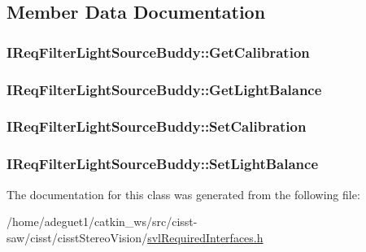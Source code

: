\subsection{Member Data Documentation}
\hypertarget{class_i_req_filter_light_source_buddy_ad55805514f5fd65daffc97e1e0a17960}{
\subsubsection[{Get\-Calibration}]{ I\-Req\-Filter\-Light\-Source\-Buddy\-::\-Get\-Calibration}}\label{class_i_req_filter_light_source_buddy_ad55805514f5fd65daffc97e1e0a17960}
\hypertarget{class_i_req_filter_light_source_buddy_a02d7dd402542d60b0e2a8eab49ae0996}{
\subsubsection[{Get\-Light\-Balance}]{ I\-Req\-Filter\-Light\-Source\-Buddy\-::\-Get\-Light\-Balance}}\label{class_i_req_filter_light_source_buddy_a02d7dd402542d60b0e2a8eab49ae0996}
\hypertarget{class_i_req_filter_light_source_buddy_a935725df98772111c6bb59934969bbad}{
\subsubsection[{Set\-Calibration}]{ I\-Req\-Filter\-Light\-Source\-Buddy\-::\-Set\-Calibration}}\label{class_i_req_filter_light_source_buddy_a935725df98772111c6bb59934969bbad}
\hypertarget{class_i_req_filter_light_source_buddy_a27a4cb9b757819473851dc8ba62e1241}{
\subsubsection[{Set\-Light\-Balance}]{ I\-Req\-Filter\-Light\-Source\-Buddy\-::\-Set\-Light\-Balance}}\label{class_i_req_filter_light_source_buddy_a27a4cb9b757819473851dc8ba62e1241}


The documentation for this class was generated from the following file\-:\begin{DoxyCompactItemize}
\item 
/home/adeguet1/catkin\-\_\-ws/src/cisst-\/saw/cisst/cisst\-Stereo\-Vision/\hyperlink{svl_required_interfaces_8h}{svl\-Required\-Interfaces.\-h}\end{DoxyCompactItemize}
